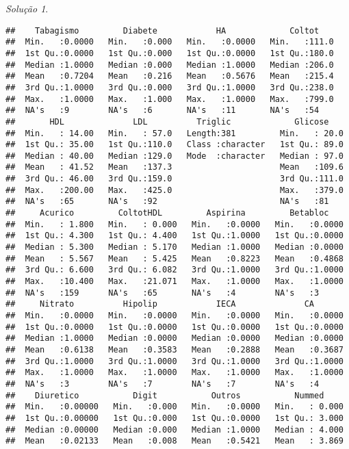 \documentclass[
]{latex/krantz}
\theoremstyle{definition}
\theoremstyle{definition}
\theoremstyle{definition}
\theoremstyle{definition}
\theoremstyle{remark}
\newtheorem*{solution}{Solução}
\begin{document}
\begin{solution}
\begin{verbatim}
##    Tabagismo         Diabete            HA             Coltot     
##  Min.   :0.0000   Min.   :0.000   Min.   :0.0000   Min.   :111.0  
##  1st Qu.:0.0000   1st Qu.:0.000   1st Qu.:0.0000   1st Qu.:180.0  
##  Median :1.0000   Median :0.000   Median :1.0000   Median :206.0  
##  Mean   :0.7204   Mean   :0.216   Mean   :0.5676   Mean   :215.4  
##  3rd Qu.:1.0000   3rd Qu.:0.000   3rd Qu.:1.0000   3rd Qu.:238.0  
##  Max.   :1.0000   Max.   :1.000   Max.   :1.0000   Max.   :799.0  
##  NA's   :9        NA's   :6       NA's   :11       NA's   :54     
##       HDL              LDL          Triglic             Glicose     
##  Min.   : 14.00   Min.   : 57.0   Length:381         Min.   : 20.0  
##  1st Qu.: 35.00   1st Qu.:110.0   Class :character   1st Qu.: 89.0  
##  Median : 40.00   Median :129.0   Mode  :character   Median : 97.0  
##  Mean   : 41.52   Mean   :137.3                      Mean   :109.6  
##  3rd Qu.: 46.00   3rd Qu.:159.0                      3rd Qu.:111.0  
##  Max.   :200.00   Max.   :425.0                      Max.   :379.0  
##  NA's   :65       NA's   :92                         NA's   :81     
##     Acurico         ColtotHDL         Aspirina         Betabloc     
##  Min.   : 1.800   Min.   : 0.000   Min.   :0.0000   Min.   :0.0000  
##  1st Qu.: 4.300   1st Qu.: 4.400   1st Qu.:1.0000   1st Qu.:0.0000  
##  Median : 5.300   Median : 5.170   Median :1.0000   Median :0.0000  
##  Mean   : 5.567   Mean   : 5.425   Mean   :0.8223   Mean   :0.4868  
##  3rd Qu.: 6.600   3rd Qu.: 6.082   3rd Qu.:1.0000   3rd Qu.:1.0000  
##  Max.   :10.400   Max.   :21.071   Max.   :1.0000   Max.   :1.0000  
##  NA's   :159      NA's   :65       NA's   :4        NA's   :3       
##     Nitrato          Hipolip            IECA              CA        
##  Min.   :0.0000   Min.   :0.0000   Min.   :0.0000   Min.   :0.0000  
##  1st Qu.:0.0000   1st Qu.:0.0000   1st Qu.:0.0000   1st Qu.:0.0000  
##  Median :1.0000   Median :0.0000   Median :0.0000   Median :0.0000  
##  Mean   :0.6138   Mean   :0.3583   Mean   :0.2888   Mean   :0.3687  
##  3rd Qu.:1.0000   3rd Qu.:1.0000   3rd Qu.:1.0000   3rd Qu.:1.0000  
##  Max.   :1.0000   Max.   :1.0000   Max.   :1.0000   Max.   :1.0000  
##  NA's   :3        NA's   :7        NA's   :7        NA's   :4       
##    Diuretico           Digit           Outros           Nummed      
##  Min.   :0.00000   Min.   :0.000   Min.   :0.0000   Min.   : 0.000  
##  1st Qu.:0.00000   1st Qu.:0.000   1st Qu.:0.0000   1st Qu.: 3.000  
##  Median :0.00000   Median :0.000   Median :1.0000   Median : 4.000  
##  Mean   :0.02133   Mean   :0.008   Mean   :0.5421   Mean   : 3.869  

\end{verbatim}
\end{solution}
\end{document}

